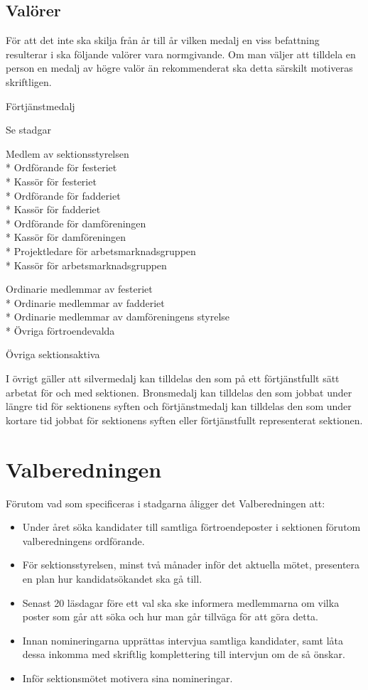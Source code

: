 \documentclass{datateknologsektionen-document}
\begin{document}
\subsection{Valörer}
För att det inte ska skilja från år till år vilken medalj en viss befattning resulterar i ska följande
valörer vara normgivande. Om man väljer att tilldela en person en medalj av högre valör än
rekommenderat ska detta särskilt motiveras skriftligen.
\begin{labeling}{Förtjänstmedalj}
  \item [Guld] Se stadgar
  \item [Silver] Medlem av sektionsstyrelsen\\*
  Ordförande för festeriet\\*
  Kassör för festeriet\\*
  Ordförande för fadderiet\\*
  Kassör för fadderiet\\*
  Ordförande för damföreningen\\*
  Kassör för damföreningen\\*
  Projektledare för arbetsmarknadsgruppen\\*
  Kassör för arbetsmarknadsgruppen
  \item [Brons] Ordinarie medlemmar av festeriet\\*
  Ordinarie medlemmar av fadderiet\\*
  Ordinarie medlemmar av damföreningens styrelse\\*
  Övriga förtroendevalda
  \item [Förtjänstmedalj] Övriga sektionsaktiva
\end{labeling}

I övrigt gäller att silvermedalj kan tilldelas den som på ett förtjänstfullt sätt arbetat för och med
sektionen. Bronsmedalj kan tilldelas den som jobbat under längre tid för sektionens syften och
förtjänstmedalj kan tilldelas den som under kortare tid jobbat för sektionens syften eller
förtjänstfullt representerat sektionen.

\section{Valberedningen}
\label{val}
Förutom vad som specificeras i stadgarna åligger det Valberedningen att:
\begin{itemize}
  \item Under året söka kandidater till samtliga förtroendeposter i sektionen förutom valberedningens ordförande.
  \item För sektionsstyrelsen, minst två månader inför det aktuella mötet, presentera en plan hur kandidatsökandet ska gå till.
  \item Senast 20 läsdagar före ett val ska ske informera medlemmarna om vilka poster som går att söka och hur man går tillväga för att göra detta.
  \item Innan nomineringarna upprättas intervjua samtliga kandidater, samt låta dessa inkomma med skriftlig komplettering till intervjun om de så önskar.
  \item Inför sektionsmötet motivera sina nomineringar.
\end{itemize}
\end{document}
